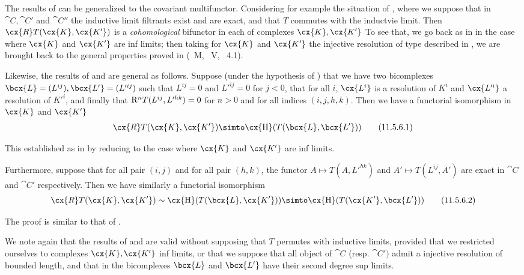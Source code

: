 \begin{env}[11.5.5]
\label{0.11.5.5}
The results of  can be generalized to the covariant multifunctor.
Considering for example the situation of , where we suppose that in $\cat{C}, \cat{C'}$ and $\cat{C''}$ 
the inductive limit filtrants exist and are exact, and that $T$ commutes with the inductvie limit.
Then $\cx{R}T(\cx{K}, \cx{K'})$ is a \emph{cohomological} bifunctor in each of complexes $\cx{K}, \cx{K'}$
To see that, we go back as in  in the case where $\cx{K}$ and $\cx{K'}$ are inf limits; 
then taking for $\cx{K}$ and $\cx{K'}$ the injective resolution of type described in , 
we are brought back to the general properties proved in (~M, ~V, ~4.1).
\end{env}

\begin{env}[11.5.6]
\label{0.11.5.6}
Likewise, the results of  and  are general as follows.
Suppose (under the hypothesis of ) that we have two bicomplexes $\bcx{L} = (L^{ij}), \bcx{L'} = (L'^{ij})$ such that $L^{ij} = 0$ and $L'^{ij} = 0$ for $j<0$, 
that for all $i$, $\cx{L^i}$ is a resolution of $K^i$ and $\cx{L'^i}$ a resolution of $K'^i$, and finally that $\mathrm{R}^n T(L^{ij}, L'^{hk})=0$ for $n>0$ and for all indices $(i,j,h,k)$.
Then we have a functorial isomorphism in $\cx{K}$ and $\cx{K'}$
\[
  \label{0.11.5.6.1}
  \cx{R}T(\cx{K}, \cx{K'}) \simto \cx{\HH}(T(\bcx{L}, \bcx{L'}))
  \tag{11.5.6.1}
\]

This established as in  by reducing to the case where $\cx{K}$ and $\cx{K'}$ are inf limits.

Furthermore, suppose that for all pair $(i,j)$ and for all pair $(h,k)$, the functor $A\mapsto T(A, L'^{hk})$ and $A'\mapsto T(L^{ij}, A')$ 
are exact in $\cat{C}$ and $\cat{C'}$ respectively. Then we have similarly a functorial isomorphism
\[
  \label{0.11.5.6.2}
  \cx{R}T(\cx{K}, \cx{K'}) \sim \cx{\HH}(T(\bcx{L}, \cx{K'})) \simto \cx{\HH}(T(\cx{K'}, \bcx{L'}))
  \tag{11.5.6.2}
\]

The proof is similar to that of .
\end{env}

\begin{env}[11.5.7]
\label{0.11.5.7}
We note again that the results of  and  are valid without supposing that $T$ permutes with inductive limits, 
provided that we restricted ourselves to complexes $\cx{K}, \cx{K'}$ inf limits, or that we suppose that all object of $\cat{C}$ (resp. $\cat{C'})$ 
admit a injective resolution of bounded length, and that in  the bicomplexes $\bcx{L}$ and $\bcx{L'}$ have their second degree sup limits.
\end{env}

